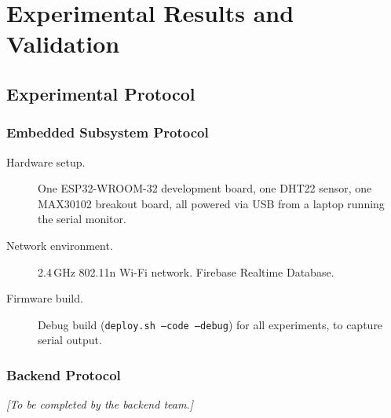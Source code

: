 
\chapter{Experimental Results and Validation}
\label{ch:results}

\section{Experimental Protocol}

\subsection{Embedded Subsystem Protocol}

\begin{description}
	\item[Hardware setup.]
	      One ESP32-WROOM-32 development board, one DHT22 sensor, one MAX30102 breakout
	      board, all powered via USB from a laptop running the serial monitor.

	\item[Network environment.]
	      2.4\,GHz 802.11n Wi-Fi network.
	      Firebase Realtime Database.

	\item[Firmware build.]
	      Debug build (\texttt{deploy.sh --code --debug}) for all experiments, to capture
	      serial output.
\end{description}

\subsection{Backend Protocol}
\begin{center}
	\textit{[To be completed by the backend team.]}
\end{center}

